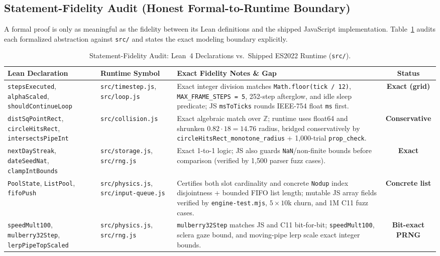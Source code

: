 \documentclass[11pt,letterpaper]{article}
\theoremstyle{remark}
\begin{document}
\subsection{Statement-Fidelity Audit (Honest Formal-to-Runtime Boundary)}
A formal proof is only as meaningful as the fidelity between its Lean definitions and the shipped JavaScript implementation. Table~\ref{tab:fidelity} audits each formalized abstraction against \texttt{src/} and states the exact modeling boundary explicitly.

\begin{table}[ht]
\centering
\caption{Statement-Fidelity Audit: Lean~4 Declarations vs.\ Shipped ES2022 Runtime (\texttt{src/}).}
\label{tab:fidelity}
\footnotesize
\setlength{\tabcolsep}{4pt}
\begin{tabular}{@{} >{\raggedright\arraybackslash}p{3.8cm} >{\raggedright\arraybackslash}p{3.4cm} >{\raggedright\arraybackslash}p{5.0cm} c @{}}
\toprule
\textbf{Lean Declaration} & \textbf{Runtime Symbol} & \textbf{Exact Fidelity Notes \& Gap} & \textbf{Status} \\
\midrule
\texttt{stepsExecuted}, \texttt{alphaScaled}, \texttt{shouldContinueLoop} & \texttt{src/timestep.js}, \texttt{src/loop.js} & Exact integer division matches \texttt{Math.floor(tick / 12)}, \texttt{MAX\_FRAME\_STEPS = 5}, 252-step afterglow, and idle sleep predicate; JS \texttt{msToTicks} rounds IEEE-754 float \texttt{ms} first. & \textbf{Exact (grid)} \\
\texttt{distSqPointRect}, \texttt{circleHitsRect}, \texttt{intersectsPipeInt} & \texttt{src/collision.js} & Exact algebraic match over $\mathbb{Z}$; runtime uses float64 and shrunken $0.82\cdot 18=14.76$ radius, bridged conservatively by \texttt{circleHitsRect\_\allowbreak monotone\_\allowbreak radius} + 1,000-trial \texttt{prop\_check}. & \textbf{Conservative} \\
\texttt{nextDayStreak}, \texttt{dateSeedNat}, \texttt{clampIntBounds} & \texttt{src/storage.js}, \texttt{src/rng.js} & Exact 1-to-1 logic; JS also guards \texttt{NaN}/non-finite bounds before comparison (verified by 1,500 parser fuzz cases). & \textbf{Exact} \\
\texttt{PoolState}, \texttt{ListPool}, \texttt{fifoPush} & \texttt{src/physics.js}, \texttt{src/input-queue.js} & Certifies both slot cardinality and concrete \texttt{Nodup} index disjointness + bounded FIFO list length; mutable JS array fields verified by \texttt{engine-test.mjs}, $5\times 10$k churn, and 1M C11 fuzz cases. & \textbf{Concrete list} \\
\texttt{speedMult100}, \texttt{mulberry32Step}, \texttt{lerpPipeTopScaled} & \texttt{src/physics.js}, \texttt{src/rng.js} & \texttt{mulberry32Step} matches JS and C11 bit-for-bit; \texttt{speedMult100}, sclera gaze bound, and moving-pipe lerp scale exact integer bounds. & \textbf{Bit-exact PRNG} \\
\bottomrule
\end{tabular}
\end{table}
\end{document}
